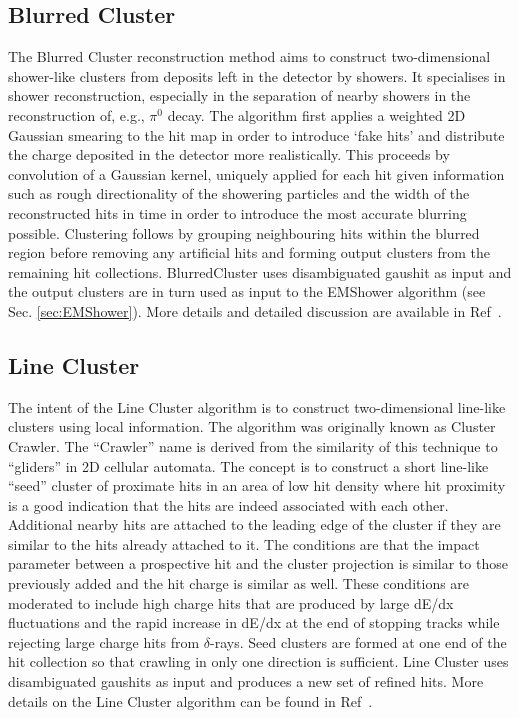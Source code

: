 \subsection{Blurred Cluster}\label{sec:BlurredCluster}
The Blurred Cluster reconstruction method aims to construct two-dimensional shower-like clusters from deposits left in the detector by showers.  It specialises in shower reconstruction, especially in the separation of nearby showers in the reconstruction of, e.g., $\pi^0$ decay.  The algorithm first applies a weighted 2D Gaussian smearing to the hit map in order to introduce `fake hits' and distribute the charge deposited in the detector more realistically.  This proceeds by convolution of a Gaussian kernel, uniquely applied for each hit given information such as rough directionality of the showering particles and the width of the reconstructed hits in time in order to introduce the most accurate blurring possible.  Clustering follows by grouping neighbouring hits within the blurred region before removing any artificial hits and forming output clusters from the remaining hit collections.  BlurredCluster uses disambiguated gaushit as input and the output clusters are in turn used as input to the EMShower algorithm (see Sec. \ref{sec:EMShower}).  More details and detailed discussion are available in Ref~\cite{ref:blurredcluster}.

\subsection{Line Cluster}\label{sec:LineCluster}
The intent of the Line Cluster algorithm is to construct two-dimensional line-like clusters using local information. The algorithm was originally known as Cluster Crawler. The ``Crawler'' name is derived from the similarity of this technique to ``gliders'' in 2D cellular automata. The concept is to construct a short line-like ``seed'' cluster of proximate hits in an area of low hit density where hit proximity is a good indication that the hits are indeed associated with each other. Additional nearby hits are attached to the leading edge of the cluster if they are similar to the hits already attached to it. The conditions are that the impact parameter between a prospective hit and the cluster projection is similar to those previously added and the hit charge is similar as well. These conditions are moderated to include high charge hits that are produced by large dE/dx fluctuations and the rapid increase in dE/dx at the end of stopping tracks while rejecting large charge hits from $\delta$-rays.
Seed clusters are formed at one end of the hit collection so that crawling in only one direction is sufficient. Line Cluster uses disambiguated gaushits as input and produces a new set of refined hits. More details on the Line Cluster algorithm can be found in Ref~\cite{ref:linecluster}.

